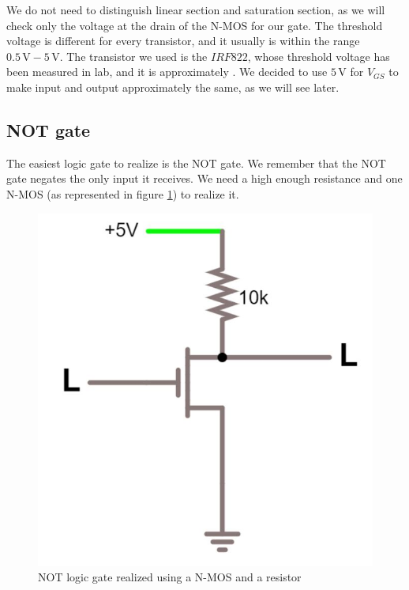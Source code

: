 \documentclass{article}
\begin{document}
\vspace{3mm}

We do not need to distinguish linear section and saturation section, as we will check only the voltage at the drain of the N-MOS for our gate. The threshold voltage is different for every transistor, and it usually is within the range $0.5\,\textrm{V} - 5\,\textrm{V}$. The transistor we used is the $IRF822$, whose threshold voltage has been measured in lab, and it is approximately %
. We decided to use $5\,\textrm{V}$ for $V_{GS}$ to make input and output approximately the same, as we will see later.


\clearpage


\subsection{NOT gate}

The easiest logic gate to realize is the NOT gate. We remember that the NOT gate negates the only input it receives. We need a high enough resistance and one N-MOS (as represented in figure \ref{NOT_N-MOS}) to realize it.

\begin{figure}[h]
    \centering
    \includegraphics[scale=0.3]{IM_NOT_NMOS.JPG}
    \caption{NOT logic gate realized using a N-MOS and a resistor}
    \label{NOT_N-MOS}
\end{figure}
\end{document}
